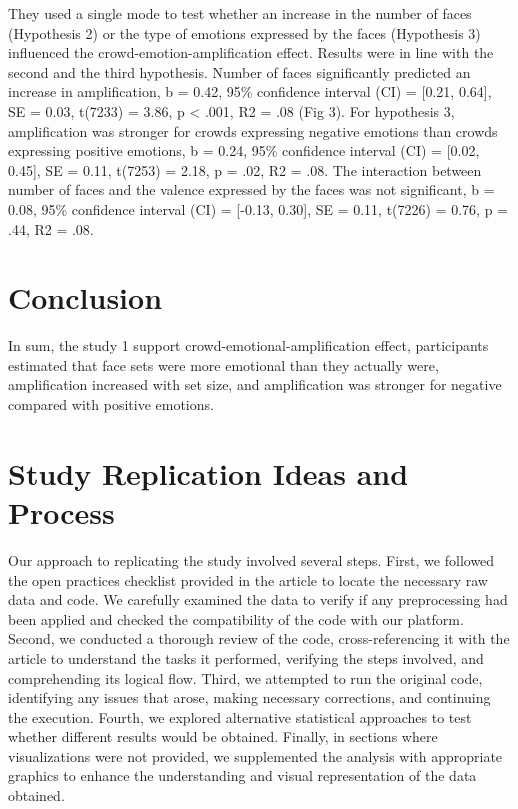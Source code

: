 \documentclass[
  man]{apa6}
\begin{document}
They used a single mode to test whether an increase in the number of faces (Hypothesis 2) or the type of emotions expressed by the faces (Hypothesis 3) influenced the crowd-emotion-amplification effect. Results were in line with the second and the third hypothesis. Number of faces significantly predicted an increase in amplification, b = 0.42, 95\% confidence interval (CI) = {[}0.21, 0.64{]}, SE = 0.03, t(7233) = 3.86, p \textless{} .001, R2 = .08 (Fig 3). For hypothesis 3, amplification was stronger for crowds expressing negative emotions than crowds expressing positive emotions, b = 0.24, 95\% confidence interval (CI) = {[}0.02, 0.45{]}, SE = 0.11, t(7253) = 2.18, p = .02, R2 = .08. The interaction between number of faces and the valence expressed by the faces was not significant, b = 0.08, 95\% confidence interval (CI) = {[}-0.13, 0.30{]}, SE = 0.11, t(7226) = 0.76, p = .44, R2 = .08.

\hypertarget{conclusion}{%
\section{Conclusion}\label{conclusion}}

In sum, the study 1 support crowd-emotional-amplification effect, participants estimated that face sets were more emotional than they actually were, amplification increased with set size, and amplification was stronger for negative compared with positive emotions.

\hypertarget{study-replication-ideas-and-process}{%
\section{Study Replication Ideas and Process}\label{study-replication-ideas-and-process}}

Our approach to replicating the study involved several steps. First, we followed the open practices checklist provided in the article to locate the necessary raw data and code. We carefully examined the data to verify if any preprocessing had been applied and checked the compatibility of the code with our platform. Second, we conducted a thorough review of the code, cross-referencing it with the article to understand the tasks it performed, verifying the steps involved, and comprehending its logical flow. Third, we attempted to run the original code, identifying any issues that arose, making necessary corrections, and continuing the execution. Fourth, we explored alternative statistical approaches to test whether different results would be obtained. Finally, in sections where visualizations were not provided, we supplemented the analysis with appropriate graphics to enhance the understanding and visual representation of the data obtained.
\end{document}
